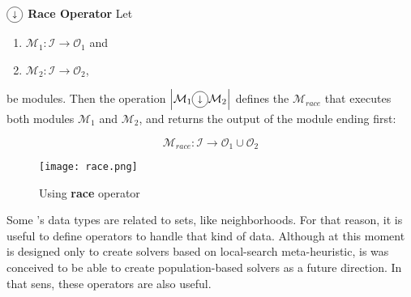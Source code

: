\begin{definition}\label{op:race}
$\circled{$\shortdownarrow$}$ {\bf Race Operator} Let 
\begin{enumerate}%
	\item $\mathcal{M}_1 : \mathcal{I} \rightarrow \mathcal{O}_1$ and  
	\item $\mathcal{M}_2 : \mathcal{I} \rightarrow \mathcal{O}_2$,
\end{enumerate}%
be modules. %
Then the operation $\left|\mathcal{M}_1\circled{$\shortdownarrow$}\mathcal{M}_2\right|$ defines the \cm{} $\mathcal{M}_{race}$ that executes both modules $\mathcal{M}_1$ and $\mathcal{M}_2$, and returns the output of the module ending first:

\[
\mathcal{M}_{race}:\mathcal{I} \rightarrow \mathcal{O}_1 \cup \mathcal{O}_2 
\]
\end{definition}


\begin{figure}[h]
	\centering	
	\texttt{[image: race.png]}
	\caption{Using {\bf race} operator}\label{fig:race_example}
\end{figure}

\separation

Some \posl's data types are related to sets, like neighborhoods. For that reason, it is useful to define operators to handle that kind of data. Although at this moment \posl{} is designed only to create solvers based on local-search meta-heuristic, is was conceived to be able to create population-based solvers as a future direction. In that sens, these operators are also useful.

